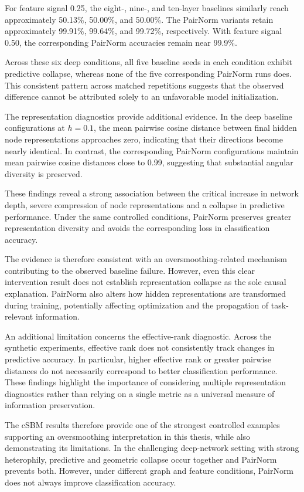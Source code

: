 \documentclass[english]{lni}
\begin{document}
For feature signal 0.25, the eight-, nine-, and ten-layer baselines similarly reach approximately 50.13\%, 50.00\%, and 50.00\%. The PairNorm variants retain approximately 99.91\%, 99.64\%, and 99.72\%, respectively. With feature signal 0.50, the corresponding PairNorm accuracies remain near 99.9\%.

Across these six deep conditions, all five baseline seeds in each condition exhibit predictive collapse, whereas none of the five corresponding PairNorm runs does. This consistent pattern across matched repetitions suggests that the observed difference cannot be attributed solely to an unfavorable model initialization.

The representation diagnostics provide additional evidence. In the deep baseline configurations at $h=0.1$, the mean pairwise cosine distance between final hidden node representations approaches zero, indicating that their directions become nearly identical. In contrast, the corresponding PairNorm configurations maintain mean pairwise cosine distances close to 0.99, suggesting that substantial angular diversity is preserved.

These findings reveal a strong association between the critical increase in network depth, severe compression of node representations and a collapse in predictive performance.  Under the same controlled conditions, PairNorm preserves greater representation diversity and avoids the corresponding loss in classification accuracy.

The evidence is therefore consistent with an oversmoothing-related mechanism contributing to the observed baseline failure. However, even this clear intervention result does not establish representation collapse as the sole causal explanation. PairNorm also alters how hidden representations are transformed during training, potentially affecting optimization and the propagation of task-relevant information.

An additional limitation concerns the effective-rank diagnostic. Across the synthetic experiments, effective rank does not consistently track changes in predictive accuracy. In particular, higher effective rank or greater pairwise distances do not necessarily correspond to better classification performance. These findings highlight the importance of considering multiple representation diagnostics rather than relying on a single metric as a universal measure of information preservation.

The cSBM results therefore provide one of the strongest controlled examples supporting an oversmoothing interpretation in this thesis, while also demonstrating its limitations. In the challenging deep-network setting with strong heterophily, predictive and geometric collapse occur together and PairNorm prevents both. However, under different graph and feature conditions, PairNorm does not always improve classification accuracy.
\end{document}
